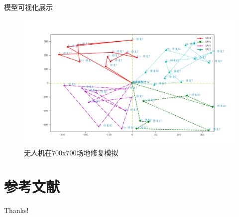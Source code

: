 \documentclass{beamer}
\begin{document}
\begin{frame}{模型可视化展示}

     \begin{figure}[htbp]
		  \centering
            \includegraphics[scale=0.4]{pic/test2.png}
            
            \caption{无人机在700x700场地修复模拟}
    \end{figure}
\end{frame}

\section{参考文献}

\begin{frame}[allowframebreaks]
    
    
\end{frame}

\begin{frame}
    \begin{center}
        {\Huge\calligra Thanks!}
    \end{center}
\end{frame}
\end{document}
